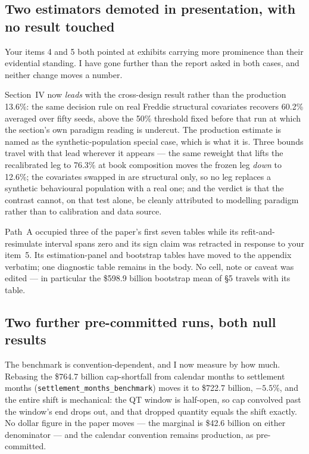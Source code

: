 \documentclass[11pt]{article}
\newcommand{\run}[1]{\texttt{#1}}
\begin{document}
\subsection{Two estimators demoted in presentation, with no result touched}

Your items 4 and 5 both pointed at exhibits carrying more prominence than their
evidential standing. I have gone further than the report asked in both cases, and
neither change moves a number.

Section~IV now \emph{leads} with the cross-design result rather than the production
13.6\%: the same decision rule on real Freddie structural covariates recovers 60.2\%
averaged over fifty seeds, above the 50\% threshold fixed before that run at which the
section's own paradigm reading is undercut. The production estimate is named as the
synthetic-population special case, which is what it is. Three bounds travel with that
lead wherever it appears --- the same reweight that lifts the recalibrated leg to
76.3\% at book composition moves the frozen leg \emph{down} to 12.6\%; the covariates
swapped in are structural only, so no leg replaces a synthetic behavioural population
with a real one; and the verdict is that the contrast cannot, on that test alone, be
cleanly attributed to modelling paradigm rather than to calibration and data source.

Path~A occupied three of the paper's first seven tables while its refit-and-resimulate
interval spans zero and its sign claim was retracted in response to your item~5. Its
estimation-panel and bootstrap tables have moved to the appendix verbatim; one
diagnostic table remains in the body. No cell, note or caveat was edited --- in
particular the \$598.9 billion bootstrap mean of \S5 travels with its table.

\subsection{Two further pre-committed runs, both null results}

The benchmark is convention-dependent, and I now measure by how much. Rebasing the
\$764.7 billion cap-shortfall from calendar months to settlement months
(\run{settlement\_months\_benchmark}) moves it to \$722.7 billion, $-5.5$\%, and the
entire shift is mechanical: the QT window is half-open, so cap convolved past the
window's end drops out, and that dropped quantity equals the shift exactly. No dollar
figure in the paper moves --- the marginal is \$42.6 billion on either denominator ---
and the calendar convention remains production, as pre-committed.
\end{document}
